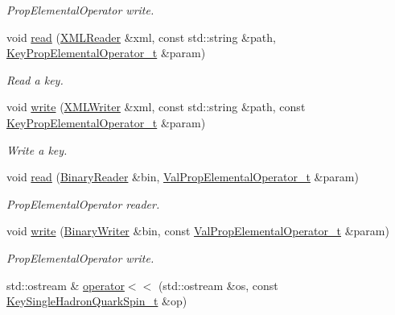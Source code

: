 \begin{DoxyCompactItemize}
\begin{DoxyCompactList}\small\item\em Prop\+Elemental\+Operator write. \end{DoxyCompactList}\item 
void \mbox{\hyperlink{namespaceHadron_a3b1642acb606c69519cf7dd88a01fbfd}{read}} (\mbox{\hyperlink{classADATXML_1_1XMLReader}{X\+M\+L\+Reader}} \&xml, const std\+::string \&path, \mbox{\hyperlink{structHadron_1_1KeyPropElementalOperator__t}{Key\+Prop\+Elemental\+Operator\+\_\+t}} \&param)
\begin{DoxyCompactList}\small\item\em Read a key. \end{DoxyCompactList}\item 
void \mbox{\hyperlink{namespaceHadron_a97758f7d26a76e70e4c61d4409eff7a6}{write}} (\mbox{\hyperlink{classADATXML_1_1XMLWriter}{X\+M\+L\+Writer}} \&xml, const std\+::string \&path, const \mbox{\hyperlink{structHadron_1_1KeyPropElementalOperator__t}{Key\+Prop\+Elemental\+Operator\+\_\+t}} \&param)
\begin{DoxyCompactList}\small\item\em Write a key. \end{DoxyCompactList}\item 
void \mbox{\hyperlink{namespaceHadron_aa192df4bf85988ad36b7c9b7c0c83dd3}{read}} (\mbox{\hyperlink{classADATIO_1_1BinaryReader}{Binary\+Reader}} \&bin, \mbox{\hyperlink{structHadron_1_1ValPropElementalOperator__t}{Val\+Prop\+Elemental\+Operator\+\_\+t}} \&param)
\begin{DoxyCompactList}\small\item\em Prop\+Elemental\+Operator reader. \end{DoxyCompactList}\item 
void \mbox{\hyperlink{namespaceHadron_a4e777dd6c1ccf60b80a383fd5901627b}{write}} (\mbox{\hyperlink{classADATIO_1_1BinaryWriter}{Binary\+Writer}} \&bin, const \mbox{\hyperlink{structHadron_1_1ValPropElementalOperator__t}{Val\+Prop\+Elemental\+Operator\+\_\+t}} \&param)
\begin{DoxyCompactList}\small\item\em Prop\+Elemental\+Operator write. \end{DoxyCompactList}\item 
std\+::ostream \& \mbox{\hyperlink{namespaceHadron_a0dfff614f40f815cfb78d828c07bc8aa}{operator$<$$<$}} (std\+::ostream \&os, const \mbox{\hyperlink{structHadron_1_1KeySingleHadronQuarkSpin__t}{Key\+Single\+Hadron\+Quark\+Spin\+\_\+t}} \&op)

\end{DoxyCompactItemize}

